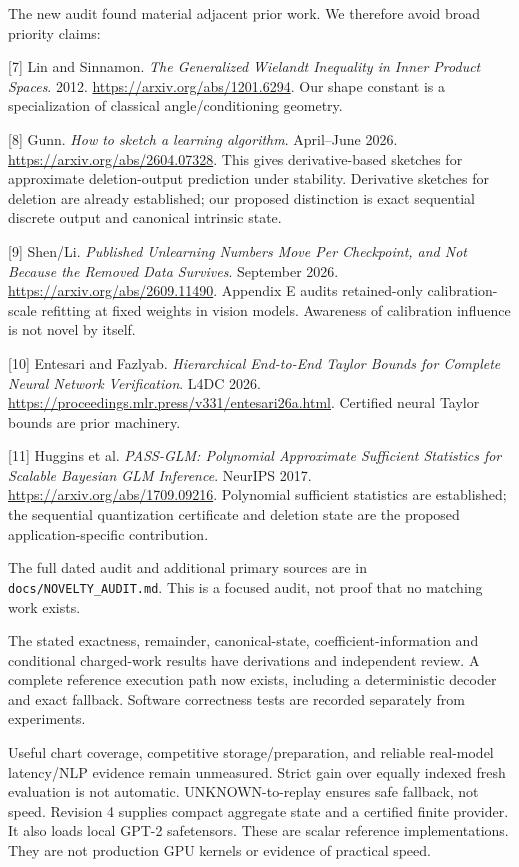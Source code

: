 The new audit found material adjacent prior work. We therefore avoid broad priority claims:

[7] Lin and Sinnamon. \emph{The Generalized Wielandt Inequality in Inner Product Spaces}. 2012. \url{https://arxiv.org/abs/1201.6294}. Our shape constant is a specialization of classical angle/conditioning geometry.

[8] Gunn. \emph{How to sketch a learning algorithm}. April--June 2026. \url{https://arxiv.org/abs/2604.07328}. This gives derivative-based sketches for approximate deletion-output prediction under stability. Derivative sketches for deletion are already established; our proposed distinction is exact sequential discrete output and canonical intrinsic state.

[9] Shen/Li. \emph{Published Unlearning Numbers Move Per Checkpoint, and Not Because the Removed Data Survives}. September 2026. \url{https://arxiv.org/abs/2609.11490}. Appendix E audits retained-only calibration-scale refitting at fixed weights in vision models. Awareness of calibration influence is not novel by itself.

[10] Entesari and Fazlyab. \emph{Hierarchical End-to-End Taylor Bounds for Complete Neural Network Verification}. L4DC 2026. \url{https://proceedings.mlr.press/v331/entesari26a.html}. Certified neural Taylor bounds are prior machinery.

[11] Huggins et al. \emph{PASS-GLM: Polynomial Approximate Sufficient Statistics for Scalable Bayesian GLM Inference}. NeurIPS 2017. \url{https://arxiv.org/abs/1709.09216}. Polynomial sufficient statistics are established; the sequential quantization certificate and deletion state are the proposed application-specific contribution.

The full dated audit and additional primary sources are in \texttt{docs/NOVELTY\_AUDIT.md}. This is a focused audit, not proof that no matching work exists.

 The stated exactness, remainder, canonical-state, coefficient-information and conditional charged-work results have derivations and independent review. A complete reference execution path now exists, including a deterministic decoder and exact fallback. Software correctness tests are recorded separately from experiments.

 Useful chart coverage, competitive storage/preparation, and reliable real-model latency/NLP evidence remain unmeasured. Strict gain over equally indexed fresh evaluation is not automatic. UNKNOWN-to-replay ensures safe fallback, not speed. Revision 4 supplies compact aggregate state and a certified finite provider. It also loads local GPT-2 safetensors. These are scalar reference implementations. They are not production GPU kernels or evidence of practical speed.

